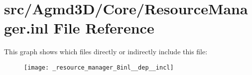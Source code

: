 \hypertarget{_resource_manager_8inl}{\section{src/\+Agmd3\+D/\+Core/\+Resource\+Manager.inl File Reference}
\label{_resource_manager_8inl}
}
This graph shows which files directly or indirectly include this file\+:\nopagebreak
\begin{figure}[H]
\begin{center}
\leavevmode
\texttt{[image: \_resource\_manager\_8inl\_\_dep\_\_incl]}
\end{center}
\end{figure}
